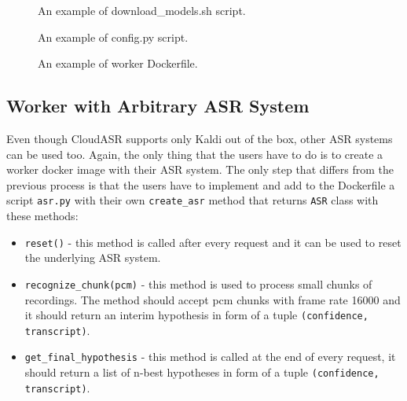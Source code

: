 \begin{figure}[h]
  

  \caption{An example of download\_models.sh script.}
  \label{fig:download-models}
\end{figure}

\begin{figure}[h]
  

  \caption{An example of config.py script.}
  \label{fig:config-py}
\end{figure}

\begin{figure}[h]
  

  \caption{An example of worker Dockerfile.}
  \label{fig:worker-dockerfile}
\end{figure}


\subsection{Worker with Arbitrary ASR System}
Even though CloudASR supports only Kaldi out of the box, other ASR systems can be used too.
Again, the only thing that the users have to do is to create a worker docker image with their ASR system.
The only step that differs from the previous process is
  that the users have to implement and add to the Dockerfile a script \texttt{asr.py} with their own \texttt{create\_asr} method
  that returns \texttt{ASR} class with these methods:

\begin{itemize}
  \item
    \texttt{reset()} - this method is called after every request
      and it can be used to reset the underlying ASR system.

  \item
    \texttt{recognize\_chunk(pcm)} - this method is used to process small chunks of recordings.
      The method should accept pcm chunks with frame rate 16000
        and it should return an interim hypothesis in form of a tuple \texttt{(confidence, transcript)}.

  \item
    \texttt{get\_final\_hypothesis} - this method is called at the end of every request,
      it should return a list of n-best hypotheses in form of a tuple \texttt{(confidence, transcript)}.

\end{itemize}

